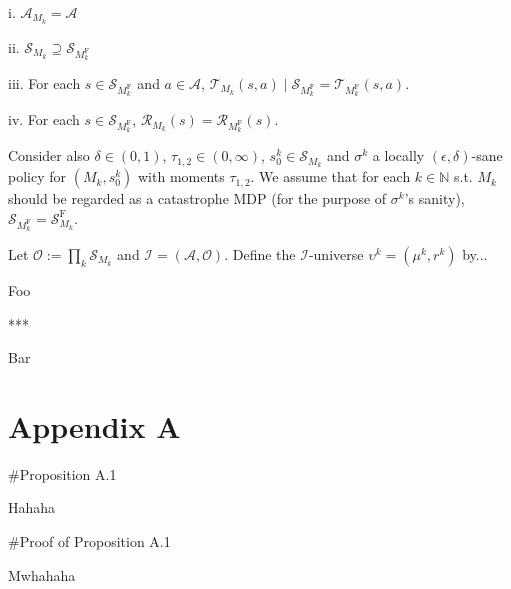 \documentclass[a4paper]{article}
\newcommand{\Nats}{\mathbb{N}}
\newcommand{\Ob}{\mathcal{O}}
\newcommand{\A}{\mathcal{A}}
\newcommand{\St}{\mathcal{S}}
\newcommand{\T}{\mathcal{T}}
\newcommand{\R}{\mathcal{R}}
\newcommand{\In}{\mathcal{I}}
\newcommand{\SF}{\St^{\text{F}}}
\newcommand{\MF}{M^{\text{F}}}
\begin{document}
i. $\A_{M_k} = \A$

ii. $\St_{M_k} \supseteq \St_{\MF_k}$

iii. For each $s \in \St_{\MF_k}$ and $a \in \A$, $\T_{M_k}(s,a) \mid \St_{\MF_k} = \T_{\MF_k}(s,a)$.

iv. For each $s \in \St_{\MF_k}$, $\R_{M_k}(s)=\R_{\MF_k}(s)$.

Consider also $\delta\in(0,1)$, $\tau_{1,2} \in (0,\infty)$, $s^k_0 \in \St_{M_k}$ and $\sigma^k$ a locally $(\epsilon,\delta)$-sane policy for $(M_k,s^k_0)$ with moments $\tau_{1,2}$. We assume that for each $k \in \Nats$ s.t. $M_k$ should be regarded as a catastrophe MDP (for the purpose of $\sigma^k$'s sanity), $\St_{\MF_k} = \SF_{M_k}$.

Let $\Ob:= \prod_k \St_{M_k}$ and $\In=(\A,\Ob)$. Define the $\In$-universe $\upsilon^k=(\mu^k,r^k)$ by... %

Foo

***

Bar

\section{Appendix A}

\#Proposition A.1

Hahaha

\#Proof of Proposition A.1

Mwhahaha
\end{document}
